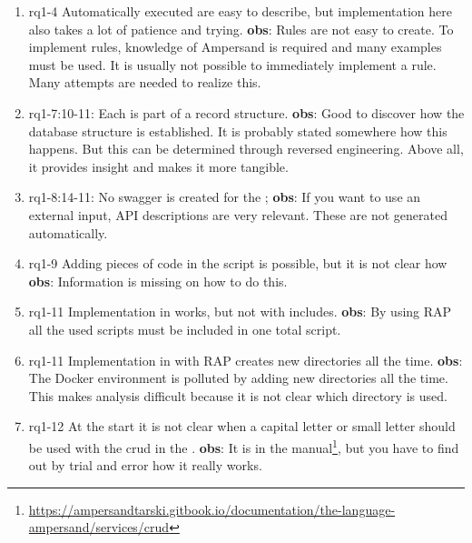 \begin{enumerate}
    \item rq1-4 Automatically executed  are easy to describe, but implementation here also takes a lot of patience and trying.
    \newline\textbf{obs}: Rules are not easy to create.
    To implement rules, knowledge of Ampersand is required and many examples must be used.
    It is usually not possible to immediately implement a rule.
    Many attempts are needed to realize this.

    \item rq1-7:10-11: Each  is part of a record structure.
    \newline\textbf{obs}: Good to discover how the database structure is established.
    It is probably stated somewhere how this happens.
    But this can be determined through reversed engineering.
    Above all, it provides insight and makes it more tangible.

    \item rq1-8:14-11: No swagger is created for the ;
    \newline\textbf{obs}: If you want to use an external input, API descriptions are very relevant.
    These are not generated automatically.
    
    \item rq1-9 Adding pieces of  code in the script is possible, but it is not clear how
    \newline\textbf{obs}: Information is missing  on how to do this.
     
    \item rq1-11 Implementation in  works, but not with includes.
    \newline\textbf{obs}: By using RAP all the used scripts must be included in one total script.
     
    \item rq1-11 Implementation in  with RAP creates new directories all the time.
    \newline\textbf{obs}: The Docker environment is polluted by adding new directories all the time.
    This makes analysis difficult because it is not clear which directory is used.
    
    \item rq1-12 At the start it is not clear when a capital letter or small letter should be used with the crud in the .
    \newline\textbf{obs}: It is in the manual\footnote{\url{https://ampersandtarski.gitbook.io/documentation/the-language-ampersand/services/crud}}, 
    but you have to find out by trial and error how it really works.
    

\end{enumerate}

